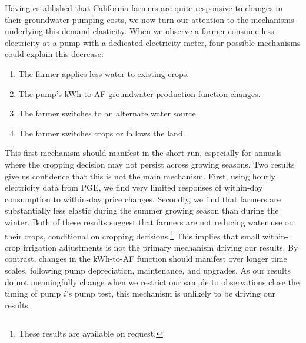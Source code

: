 %
%
Having established that California farmers are quite responsive to changes in their groundwater pumping costs, we now turn our attention to the mechanisms underlying this demand elasticity. When we observe a farmer consume less electricity at a pump with a dedicated electricity meter, four possible mechanisms could explain this decrease:
\begin{enumerate}
	\item The farmer applies less water to existing crops.
	\item The pump's kWh-to-AF groundwater production function changes.
	\item The farmer switches to an alternate water source.
	\item The farmer switches crops or fallows the land. 
\end{enumerate}
This first mechanism should manifest in the short run, especially for annuals where the cropping decision may not persist across growing seasons. Two results give us confidence that this is not the main mechanism. First, using hourly electricity data from PGE, we find very limited responses of within-day consumption to within-day price changes. Secondly, we find that farmers are substantially less elastic during the summer growing season than during the winter. Both of these results suggest that farmers are not reducing water use on their crops, conditional on cropping decisions.\footnote{These results are available on request.} This implies that small within-crop irrigation adjustments is not the primary mechanism driving our results. By contrast, changes in the kWh-to-AF function should manifest over longer time scales, following pump depreciation, maintenance, and upgrades. As our results do not meaningfully change when we restrict our sample to observations close the timing of pump $i$'s pump test, this mechanism is unlikely to be driving our results. 

